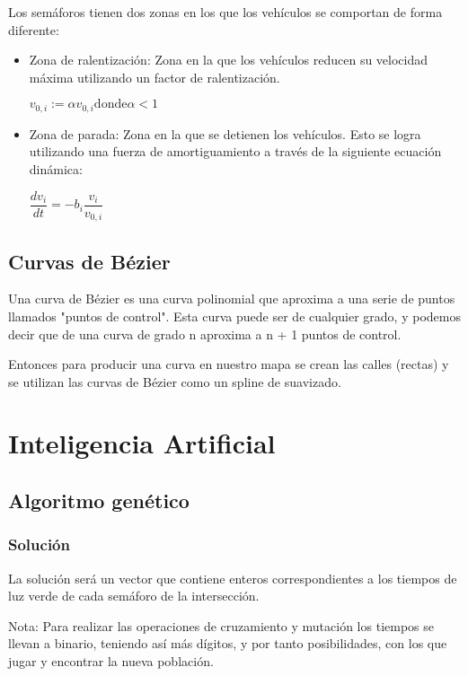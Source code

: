 \documentclass[twoside,twocolumn]{article} %
\begin{document}
	Los sem\'aforos tienen dos zonas en los que los veh\'iculos se comportan de forma diferente:
	\begin{itemize}
		\item Zona de ralentización: Zona en la que los vehículos reducen su velocidad máxima utilizando un factor de ralentización.
		\begin{center}
			$ v_{0,i} := \alpha v_{0,i} \text{donde} \alpha < 1$
		\end{center}
		\item Zona de parada: Zona en la que se detienen los vehículos. Esto se logra utilizando una fuerza de amortiguamiento a través de la siguiente ecuación dinámica:
		\begin{center}
			$ \dfrac{dv_{i}}{dt} = -b_{i} \dfrac{v_{i}}{v_{0,i}} $
		\end{center}
	\end{itemize}
	
	\subsection{Curvas de Bézier}
	
	Una curva de Bézier es una curva polinomial que aproxima a una serie de puntos llamados "puntos de control". Esta curva puede ser de cualquier grado, y podemos decir que de una curva de grado n aproxima a  n + 1 puntos de control. 
	
	Entonces para producir una curva en nuestro mapa se crean las calles (rectas) y se utilizan las curvas de B\'ezier como un spline de suavizado.
	 
	\section{Inteligencia Artificial}
	
	\subsection{Algoritmo genético}
	
	\subsubsection{Solución}
	
	La solución será un vector que contiene enteros correspondientes a los tiempos de luz verde de cada semáforo de la intersección.
	
	Nota: Para realizar las operaciones de cruzamiento y mutaci\'on los tiempos se llevan a binario, teniendo as\'i m\'as d\'igitos, y por tanto posibilidades, con los que jugar y encontrar la nueva poblaci\'on.
	
\end{document}
